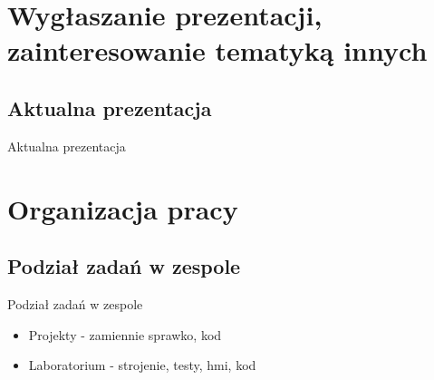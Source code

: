 \documentclass{beamer}
\begin{document}
\section{Wygłaszanie prezentacji, zainteresowanie tematyką innych}

	\subsection{Aktualna prezentacja}
	\begin{frame}{Aktualna prezentacja}
		
	\end{frame}

\section{Organizacja pracy}

	\subsection{Podział zadań w zespole}
	\begin{frame}{Podział zadań w zespole}
		\begin{itemize}
			\item Projekty - zamiennie sprawko, kod
			\item Laboratorium - strojenie, testy, hmi, kod
		\end{itemize}
	\end{frame}
\end{document}
